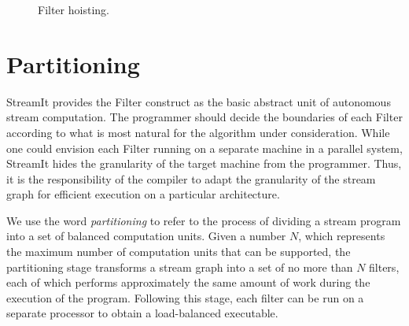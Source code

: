 \begin{figure}
\vspace{-6pt}
\centering
{}
\vspace{-12pt}
\caption{\protect\small Filter hoisting.
\protect\label{fig:splitjoin-split}}
\vspace{-6pt}
\end{figure}

\section{Partitioning}
\label{sec:partition}

StreamIt provides the Filter construct as the basic abstract unit of
autonomous stream computation.  The programmer should decide the
boundaries of each Filter according to what is most natural for the
algorithm under consideration.  While one could envision each Filter
running on a separate machine in a parallel system, StreamIt hides the
granularity of the target machine from the programmer.  Thus, it is
the responsibility of the compiler to adapt the granularity of the
stream graph for efficient execution on a particular architecture.

We use the word {\it partitioning} to refer to the process of dividing
a stream program into a set of balanced computation units.  Given a
number $N$, which represents the maximum number of computation units
that can be supported, the partitioning stage transforms a stream
graph into a set of no more than $N$ filters, each of which performs
approximately the same amount of work during the execution of the
program.  Following this stage, each filter can be run on a separate
processor to obtain a load-balanced executable.


